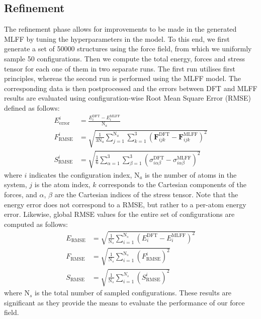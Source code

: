 \subsection{Refinement}
The refinement phase allows for improvements to be made in the generated MLFF by tuning the hyperparameters in the model. To this end, we first generate a set of 50000 structures using the force field, from which we uniformly sample 50 configurations. Then we compute the total energy, forces and stress tensor for each one of them in two separate runs. The first run utilises first principles, whereas the second run is performed using the MLFF model. The corresponding data is then postprocessed and the errors between DFT and MLFF results are evaluated using configuration-wise Root Mean Square Error (RMSE) defined as follows:
\begin{subequations}
    \label{eq:rmse_per_conf}
    \begin{align}
        \label{eq:energy_error}
        E^i_{\text{error}} &= \frac{E_i^{\text{DFT}} - E_i^{\text{MLFF}}}{\text{N}_{a}} \\
        \label{eq:force_error}
        F^i_{\text{RMSE}} &= \sqrt{\frac{1}{3\text{N}_{a}}\sum_{j=1}^{\text{N}_{a}}\sum_{k=1}^{3} \left(\mathbf{F}_{ijk}^{\text{DFT}} - \mathbf{F}_{ijk}^{\text{MLFF}}\right)^2} \\
        \label{eq:stress_error}
        S^i_{\text{RMSE}} &= \sqrt{\frac{1}{6} \sum_{\alpha=1}^{3}\sum_{\beta=1}^{3} \left(\sigma_{i\alpha\beta}^{\text{DFT}} - \sigma_{i\alpha\beta}^{\text{MLFF}}\right)^2}
    \end{align}
\end{subequations}
where $i$ indicates the configuration index, $\text{N}_a$ is the number of atoms in the system, $j$ is the atom index, $k$ corresponds to the Cartesian components of the forces, and $\alpha$, $\beta$ are the Cartesian indices of the stress tensor. Note that the energy error does not correspond to a RMSE, but rather to a per-atom energy error. Likewise, global RMSE values for the entire set of configurations are computed as follows:
\begin{subequations}
    \label{eq:rmse_global}
    \begin{align}
        \label{eq:rmse_e}
        E_{\text{RMSE}} &= \sqrt{\frac{1}{\text{N}_s}\sum_{i=1}^{\text{N}_s} \left(E_i^{\text{DFT}} - E_i^{\text{MLFF}}\right)^2} \\
        \label{eq:rmse_f}
        F_{\text{RMSE}} &= \sqrt{\frac{1}{\text{N}_{s}} \sum_{i=1}^{\text{N}_{s}} \left(F^i_{\text{RMSE}} \right)^2} \\
        \label{eq:rmse_s}
        S_{\text{RMSE}} &= \sqrt{\frac{1}{\text{N}_s} \sum_{i=1}^{N_s} \left(S^i_{\text{RMSE}} \right)^2}
    \end{align}
\end{subequations}
where $\text{N}_s$ is the total number of sampled configurations. These results are significant as they provide the means to evaluate the performance of our force field.

